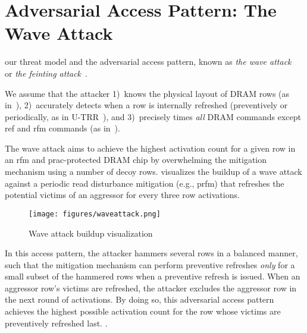 \section{Adversarial Access Pattern: The Wave Attack}
\label{sec:adversarial}

 our threat model and the adversarial access pattern, known as \emph{the wave attack}~\cite{yaglikci2021security, devaux2021method} or \emph{the feinting attack}~\cite{marazzi2022protrr}.

We assume that the attacker
1)~knows the physical layout of DRAM rows (as in~\cite{yaglikci2021blockhammer}),
2)~accurately detects when a row is internally refreshed (preventively or periodically, as in U-TRR~\cite{hassan2021utrr}), and
3)~precisely times \emph{all} DRAM commands except \gls{ref} and \gls{rfm} commands (as in~\cite{yaglikci2021blockhammer, hassan2021utrr}). 

The wave attack aims to achieve the highest activation count for a given row in an \gls{rfm} and \gls{prac}-protected DRAM chip by overwhelming the mitigation mechanism using a number of decoy rows.
 visualizes the buildup of a wave attack against a periodic read disturbance mitigation  (e.g., \gls{prfm}) that refreshes the potential victims of an aggressor for every three row activations.

\begin{figure}[h]
\centering
\texttt{[image: figures/waveattack.png]}
\caption{Wave attack buildup visualization}
\label{fig:waveattack}
\end{figure}

In this access pattern, the attacker hammers several rows in a balanced manner, such that the mitigation mechanism can perform preventive refreshes \emph{only} for a small subset of the hammered rows when a preventive refresh is issued.
When an aggressor row's victims are refreshed, the attacker excludes the aggressor row in the next round of activations.
By doing so, this adversarial access pattern achieves the highest possible activation count for the row whose victims are preventively refreshed last.
.